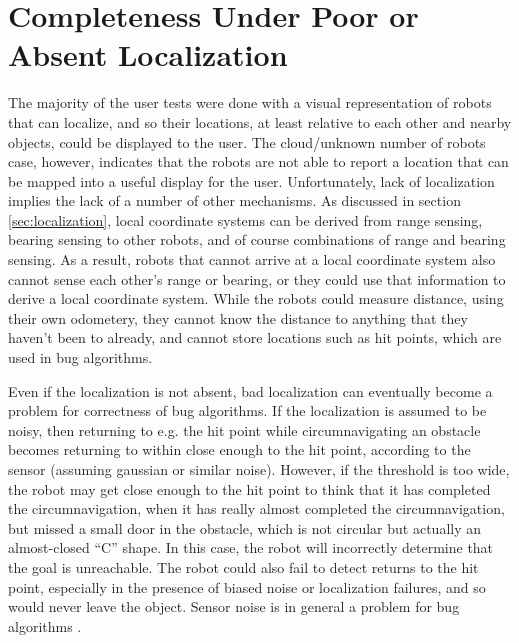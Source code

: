 %
%
%
%

\section{Completeness Under Poor or Absent Localization}

The majority of the user tests were done with a visual representation of robots that can localize, and so their locations, at least relative to each other and nearby objects, could be displayed to the user. 
The cloud/unknown number of robots case, however, indicates that the robots are not able to report a location that can be mapped into a useful display for the user. 
Unfortunately, lack of localization implies the lack of a number of other mechanisms. 
As discussed in section \ref{sec:localization}, local coordinate systems can be derived from range sensing, bearing sensing to other robots, and of course combinations of range and bearing sensing. 
As a result, robots that cannot arrive at a local coordinate system also cannot sense each other's range or bearing, or they could use that information to derive a local coordinate system. 
While the robots could measure distance, using their own odometery, they cannot know the distance to anything that they haven't been to already, and cannot store locations such as hit points, which are used in bug algorithms. 

Even if the localization is not absent, bad localization can eventually become a problem for correctness of bug algorithms. 
If the localization is assumed to be noisy, then returning to e.g. the hit point while circumnavigating an obstacle becomes returning to within close enough to the hit point, according to the sensor (assuming gaussian or similar noise). 
However, if the threshold is too wide, the robot may get close enough to the hit point to think that it has completed the circumnavigation, when it has really almost completed the circumnavigation, but missed a small door in the obstacle, which is not circular but actually an almost-closed ``C'' shape. 
In this case, the robot will incorrectly determine that the goal is unreachable. 
The robot could also fail to detect returns to the hit point, especially in the presence of biased noise or localization failures, and so would never leave the object. 
Sensor noise is in general a problem for bug algorithms \cite{ng2007performance}.

